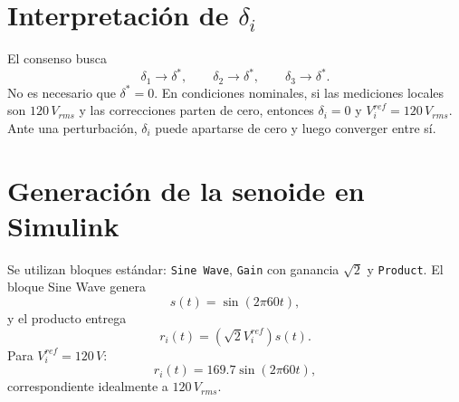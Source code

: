 \documentclass[12pt,a4paper]{article}
\begin{document}
\section{Interpretación de $\delta_i$}
El consenso busca
\begin{equation}
\delta_1\rightarrow\delta^{*},\qquad
\delta_2\rightarrow\delta^{*},\qquad
\delta_3\rightarrow\delta^{*}.
\end{equation}
No es necesario que $\delta^{*}=0$. En condiciones nominales, si las mediciones locales son $120\,V_{rms}$ y las correcciones parten de cero, entonces $\delta_i=0$ y $V_i^{ref}=120\,V_{rms}$. Ante una perturbación, $\delta_i$ puede apartarse de cero y luego converger entre sí.

\section{Generación de la senoide en Simulink}
Se utilizan bloques estándar: \texttt{Sine Wave}, \texttt{Gain} con ganancia $\sqrt{2}$ y \texttt{Product}. El bloque Sine Wave genera
\begin{equation}
s(t)=\sin(2\pi60t),
\end{equation}
y el producto entrega
\begin{equation}
r_i(t)=(\sqrt{2}V_i^{ref})s(t).
\end{equation}
Para $V_i^{ref}=120\,V$:
\begin{equation}
r_i(t)=169.7\sin(2\pi60t),
\end{equation}
correspondiente idealmente a $120\,V_{rms}$.
\end{document}
